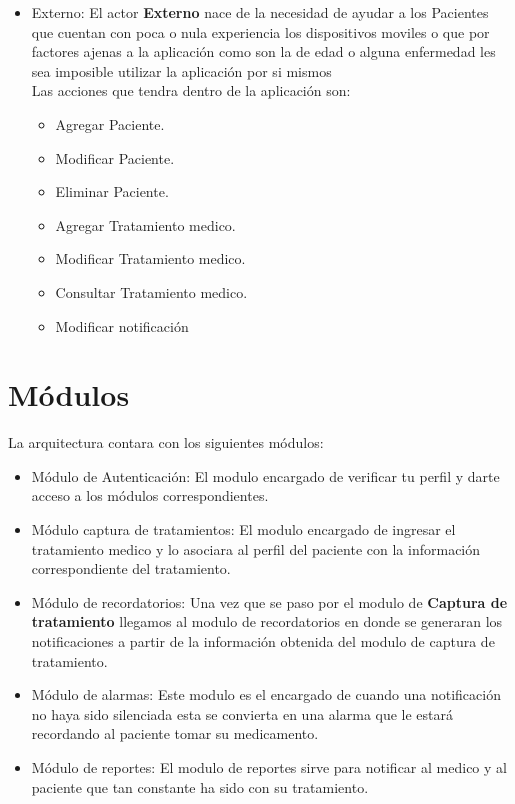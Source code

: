 \begin{itemize}
	\item Externo: El actor \textbf{Externo} nace de la necesidad de ayudar a los Pacientes que cuentan con poca o nula experiencia los dispositivos moviles o que por factores ajenas a la aplicación como son la de edad o alguna enfermedad les sea imposible utilizar la aplicación por si mismos\\
	Las acciones que tendra dentro de la aplicación son:
	\begin{itemize}
		\item Agregar Paciente.
		\item Modificar Paciente.
		\item Eliminar Paciente.
		\item Agregar Tratamiento medico.
		\item Modificar Tratamiento medico.
		\item Consultar Tratamiento medico.
		\item Modificar notificación
	\end{itemize}
\end{itemize}


\section{Módulos}
La arquitectura contara con los siguientes módulos:
\begin{itemize}
	\item Módulo de Autenticación: El modulo encargado de verificar tu perfil y darte acceso a los módulos correspondientes.
	\item Módulo captura de tratamientos: El modulo encargado de ingresar el tratamiento medico y lo asociara al perfil del paciente con la información correspondiente del tratamiento.
	\item Módulo de recordatorios: Una vez que se paso por el modulo de \textbf{Captura de tratamiento} llegamos al modulo de recordatorios en donde se generaran los notificaciones a partir de la información obtenida del modulo de captura de tratamiento.
	\item Módulo de alarmas: Este modulo es el encargado de cuando una notificación no haya sido silenciada esta se convierta en una alarma que le estará recordando al paciente tomar su medicamento.
	\item Módulo de reportes: El modulo de reportes sirve para notificar al medico y al paciente que tan constante ha sido con su tratamiento.
\end{itemize}

